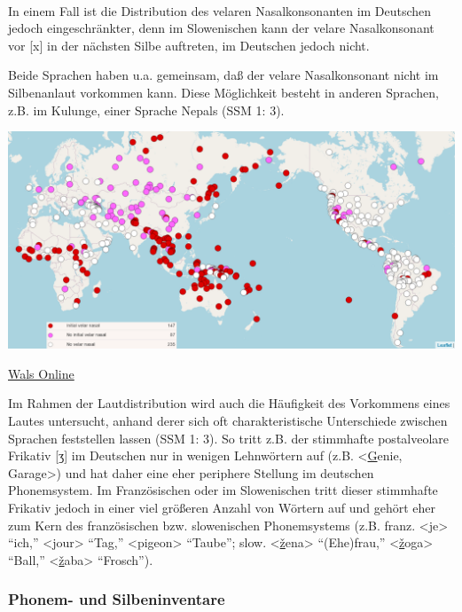 \documentclass[
]{article}
\begin{document}
~

In einem Fall ist die Distribution des velaren Nasalkonsonanten im
Deutschen jedoch eingeschränkter, denn im Slowenischen kann der velare
Nasalkonsonant vor {[}x{]} in der nächsten Silbe auftreten, im Deutschen
jedoch nicht.

Beide Sprachen haben u.a. gemeinsam, daß der velare Nasalkonsonant nicht
im Silbenanlaut vorkommen kann. Diese Möglichkeit besteht in anderen
Sprachen, z.B. im Kulunge, einer Sprache Nepals (SSM 1: 3).

\includegraphics[width=1\linewidth]{pictures/01b_NSG_Intro_2020-10-07/wals_velar_nasal}

\href{https://wals.info/}{Wals Online}

Im Rahmen der Lautdistribution wird auch die Häufigkeit des Vorkommens
eines Lautes untersucht, anhand derer sich oft charakteristische
Unterschiede zwischen Sprachen feststellen lassen (SSM 1: 3). So tritt
z.B. der stimmhafte postalveolare Frikativ {[}ʒ{]} im Deutschen nur in
wenigen Lehnwörtern auf (z.B. \textless{}\underline{G}enie, Gara\underline{g}e\textgreater) und hat
daher eine eher periphere Stellung im deutschen Phonemsystem. Im
Französischen oder im Slowenischen tritt dieser stimmhafte Frikativ
jedoch in einer viel größeren Anzahl von Wörtern auf und gehört eher zum
Kern des französischen bzw. slowenischen Phonemsystems (z.B. franz.
\textless{}\underline{j}e\textgreater{} ``ich,'' \textless{}\underline{j}our\textgreater{} ``Tag,'' \textless pi\underline{g}eon\textgreater{} ``Taube'';
slow. \textless{}\underline{ž}ena\textgreater{} ``(Ehe)frau,'' \textless{}\underline{ž}oga\textgreater{} ``Ball,''
\textless{}\underline{ž}aba\textgreater{} ``Frosch'').

\hypertarget{phonem--und-silbeninventare}{%
\subsubsection{Phonem- und Silbeninventare}\label{phonem--und-silbeninventare}}
\end{document}
